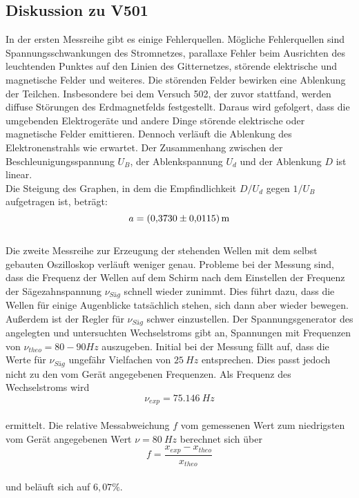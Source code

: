 \subsection{Diskussion zu V501}
In der ersten Messreihe gibt es einige Fehlerquellen.
Mögliche Fehlerquellen sind Spannungsschwankungen des Stromnetzes, parallaxe Fehler beim Ausrichten des leuchtenden Punktes auf den Linien des Gitternetzes,
störende elektrische und magnetische Felder und weiteres.
Die störenden Felder bewirken eine Ablenkung der Teilchen.
Insbesondere bei dem Versuch 502, der zuvor stattfand, werden diffuse Störungen des Erdmagnetfelds festgestellt.
Daraus wird gefolgert, dass die umgebenden Elektrogeräte und andere Dinge störende elektrische oder magnetische Felder emittieren.
Dennoch verläuft die Ablenkung des Elektronenstrahls wie erwartet.
Der Zusammenhang zwischen der Beschleunigungsspannung $U_{B}$, der Ablenkspannung $U_{d}$ und der Ablenkung $D$ ist linear.
\\Die Steigung des Graphen, in dem die Empfindlichkeit $D/U_{d}$ gegen $1/U_{B}$ aufgetragen ist, beträgt:
\begin{equation*}
  a=\SI{0,3730 \pm 0,0115}{m}
\end{equation*}
\\Die zweite Messreihe zur Erzeugung der stehenden Wellen mit dem selbst gebauten Oszilloskop verläuft weniger genau.
Probleme bei der Messung sind, dass die Frequenz der Wellen auf dem Schirm nach dem Einstellen der Frequenz der Sägezahnspannung $\nu_{Säg}$ schnell wieder zunimmt.
Dies führt dazu, dass die Wellen für einige Augenblicke tatsächlich stehen, sich dann aber wieder bewegen.
Außerdem ist der Regler für $\nu_{Säg}$ schwer einzustellen.
Der Spannungsgenerator des angelegten und untersuchten Wechselstroms gibt an, Spannungen mit Frequenzen von $\nu_{theo}= 80-90 \si{Hz}$ auszugeben.
Initial bei der Messung fällt auf, dass die Werte für $\nu_{Säg}$ ungefähr Vielfachen von $\SI{25}{Hz}$ entsprechen.
Dies passt jedoch nicht zu den vom Gerät angegebenen Frequenzen.
Als Frequenz des Wechselstroms wird
\begin{equation*}
  \nu_{exp} = \SI{75,146}{Hz}
\end{equation*}
\\ermittelt.
Die relative Messabweichung $f$ vom gemessenen Wert zum niedrigsten vom Gerät angegebenen Wert $\nu=\SI{80}{Hz}$ berechnet sich über
\begin{equation}
  f=\frac{x_{exp}-x_{theo}}{x_{theo}}
  \label{eq:abw}
\end{equation}
\\und beläuft sich auf $6,07\%$.

